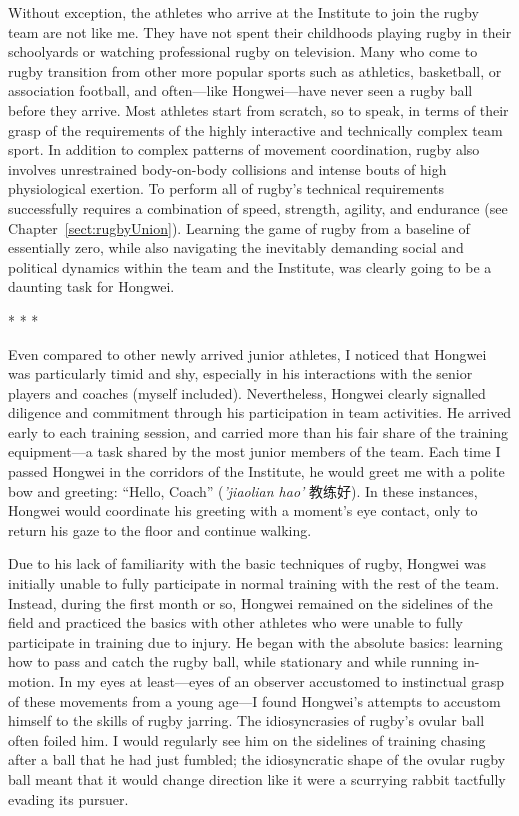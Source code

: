 \begin{CJK}{UTF8}{gbsn}
Without exception, the athletes who arrive at the Institute to join the rugby team are not like me. They have not spent their childhoods playing rugby in their schoolyards or watching professional rugby on television. Many who come to rugby transition from other more popular sports such as athletics, basketball, or association football, and often---like Hongwei---have never seen a rugby ball before they arrive.  Most athletes start from scratch, so to speak, in terms of their grasp of the requirements of the highly interactive and technically complex team sport.  In addition to complex patterns of movement coordination, rugby also involves unrestrained body-on-body collisions and intense bouts of high physiological exertion.  To perform all of rugby's technical requirements successfully requires a combination of speed, strength, agility, and endurance (see Chapter~\ref{sect:rugbyUnion}).  Learning the game of rugby from a baseline of essentially zero, while also navigating the inevitably demanding social and political dynamics within the team and the Institute, was clearly going to be a daunting task for Hongwei.


                        \begin{center}
                            * * *
                        \end{center}

Even compared to other newly arrived junior athletes, I noticed that Hongwei was particularly timid and shy, especially in his interactions with the senior players and coaches (myself included).  Nevertheless, Hongwei clearly signalled diligence and commitment through his participation in team activities.  He arrived early to each training session, and carried more than his fair share of the training equipment---a task shared by the most junior members of the team.  Each time I passed Hongwei in the corridors of the Institute, he would greet me with a polite bow and greeting: ``Hello, Coach'' (\textit{'jiaolian hao'} 教练好).  In these instances, Hongwei would coordinate his greeting with a moment's eye contact, only to return his gaze to the floor and continue walking.

Due to his lack of familiarity with the basic techniques of rugby, Hongwei was initially unable to fully participate in normal training with the rest of the team.  Instead, during the first month or so, Hongwei remained on the sidelines of the field and practiced the basics with other athletes who were unable to fully participate in training due to injury. He began with the absolute basics: learning how to pass and catch the rugby ball, while stationary and while running in-motion. In my eyes at least---eyes of an observer accustomed to instinctual grasp of these movements from a young age---I found Hongwei's attempts to accustom himself to the skills of rugby jarring. The idiosyncrasies of rugby's ovular ball often foiled him.  I would regularly see him on the sidelines of training chasing after a ball that he had just fumbled; the idiosyncratic shape of the ovular rugby ball meant that it would change direction like it were a scurrying rabbit tactfully evading its pursuer.


\end{CJK}
